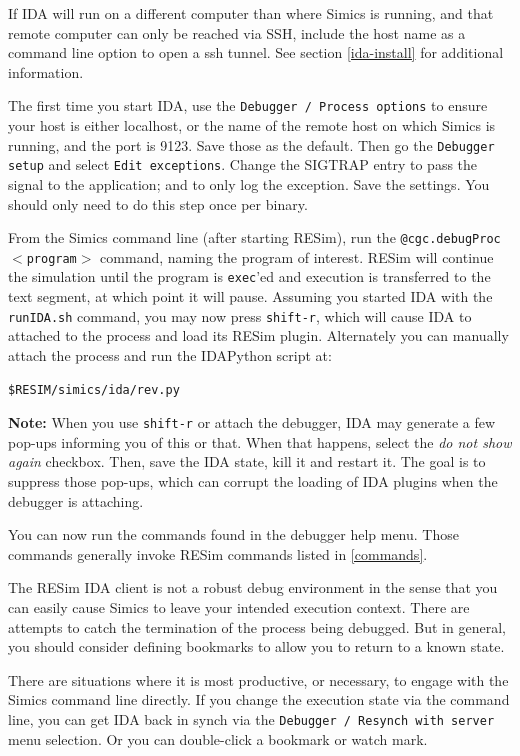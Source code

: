 \documentclass[titlepage]{article}
\begin{document}
If IDA will run on a different computer than where Simics is running, and that remote computer can only be reached via SSH, include the host 
name as a command line option to open a ssh tunnel.  See section \ref{ida-install} for additional information.

The first time you start IDA, use the {\tt Debugger / Process options} to ensure your host is either localhost, or the name of the remote host
on which Simics is running, and the port is 9123.  Save those as 
the default.  Then go the {\tt Debugger setup} and select {\tt Edit exceptions}.  Change the SIGTRAP entry to pass the signal to the application;
and to only log the exception.  Save the settings.  You should only need to do this step once per binary.

From the Simics command line (after starting RESim), run the {\tt @cgc.debugProc$<$program$>$} command, naming the program of interest.
RESim will continue the simulation until the program is {\tt exec}'ed and execution is transferred to the text segment, at which point it will pause.
Assuming you started IDA with the {\tt runIDA.sh} command, you may now press {\tt shift-r}, which will cause IDA to attached to the
process and load its RESim plugin.  Alternately you can manually attach the process and run the IDAPython script at:
\begin{verbatim}
$RESIM/simics/ida/rev.py
\end{verbatim}

\noindent \textbf{Note:} When you use {\tt shift-r} or attach the debugger, IDA may generate a few pop-ups informing you of this or that.  When that happens, select the 
\textit{do not show again} checkbox.  Then, save the IDA state, kill it and restart it.  The goal is to suppress those pop-ups, which can corrupt the
loading of IDA plugins when the debugger is attaching.

You can now run the commands found in the debugger help menu.  Those commands generally invoke RESim commands listed in \ref{commands}.

The RESim IDA client is not a robust debug environment in the sense that you can easily cause Simics to leave your intended execution context.
There are attempts to catch the termination of the process being debugged.  But in general, you should consider defining bookmarks to allow you to
return to a known state.  

There are situations where it is most productive, or necessary, to engage with the Simics command line directly.  If you change the execution state
via the command line, you can get IDA back in synch via the {\tt Debugger / Resynch with server} menu selection.  Or you can double-click a bookmark
or watch mark.
\end{document}
